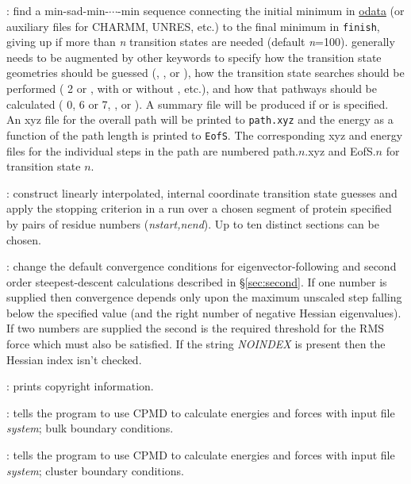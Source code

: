 {{: find a min-sad-min-$\cdots$-min sequence connecting
the initial minimum in \hyperlink{odata}{odata}  
(or auxiliary files for CHARMM, UNRES, etc.) to the final minimum in {\tt finish},
giving up if more than {\it n\/} transition states are needed (default {\it n\/}=100). 
generally needs to be augmented by other keywords to specify how the transition
state geometries should be guessed (, , {}
or {}), how the transition
state searches should be performed ({ 2\/} or {}, with or
without {}, {} etc.), and how that pathways should be
calculated ({ 0,\/} 6 or 7, {}, {} or {}).
A summary file will be produced if {} or {} is specified. An xyz file
for the overall path will be printed to {\tt path.xyz} and the energy as a
function of the path length is printed to {\tt EofS}. The corresponding xyz and energy
files for the individual steps in the path are numbered path.$n$.xyz and EofS.$n$ for
transition state $n$.

: construct linearly interpolated, internal coordinate
transition state guesses and apply the stopping criterion in a  run over a chosen
segment of protein specified by pairs of residue numbers
({\it nstart,nend\/}).  Up to ten distinct sections can be chosen.

: change the default convergence conditions
for eigenvector-following and second order steepest-descent calculations 
described in \S\ref{sec:second}. If one number is supplied then convergence depends only upon
the maximum unscaled step falling below the specified value (and the right number
of negative Hessian eigenvalues). If two numbers are supplied the second is the 
required threshold for the RMS force which must also be satisfied.
If the string {\it NOINDEX\/} is present then the Hessian index isn't checked.

: prints copyright information.

: tells the program to use CPMD to calculate energies and
forces with input file {\it system\/}; bulk boundary conditions.

: tells the program to use CPMD to calculate energies and
forces with input file {\it system\/}; cluster boundary conditions.

}}
